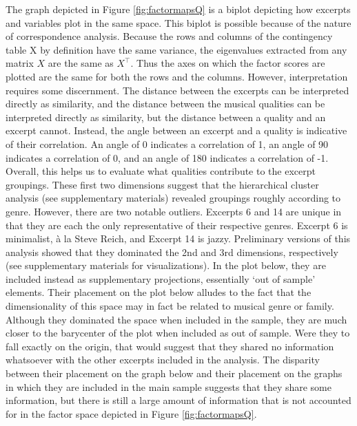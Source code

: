 \documentclass[
  english,
  man,floatsintext]{apa6}
\begin{document}
The graph depicted in Figure \ref{fig:factormapsQ} is a biplot depicting how excerpts and variables plot in the same space. This biplot is possible because of the nature of correspondence analysis. Because the rows and columns of the contingency table X by definition have the same variance, the eigenvalues extracted from any matrix \(\textit{X}\) are the same as \(\textit{X}^\top\). Thus the axes on which the factor scores are plotted are the same for both the rows and the columns. However, interpretation requires some discernment. The distance between the excerpts can be interpreted directly as similarity, and the distance between the musical qualities can be interpreted directly as similarity, but the distance between a quality and an excerpt cannot. Instead, the angle between an excerpt and a quality is indicative of their correlation. An angle of 0 indicates a correlation of 1, an angle of 90 indicates a correlation of 0, and an angle of 180 indicates a correlation of -1.\\
Overall, this helps us to evaluate what qualities contribute to the excerpt groupings. These first two dimensions suggest that the hierarchical cluster analysis (see supplementary materials) revealed groupings roughly according to genre. However, there are two notable outliers. Excerpts 6 and 14 are unique in that they are each the only representative of their respective genres. Excerpt 6 is minimalist, à la Steve Reich, and Excerpt 14 is jazzy. Preliminary versions of this analysis showed that they dominated the 2nd and 3rd dimensions, respectively (see supplementary materials for visualizations). In the plot below, they are included instead as supplementary projections, essentially `out of sample' elements. Their placement on the plot below alludes to the fact that the dimensionality of this space may in fact be related to musical genre or family. Although they dominated the space when included in the sample, they are much closer to the barycenter of the plot when included as out of sample. Were they to fall exactly on the origin, that would suggest that they shared no information whatsoever with the other excerpts included in the analysis. The disparity between their placement on the graph below and their placement on the graphs in which they are included in the main sample suggests that they share some information, but there is still a large amount of information that is not accounted for in the factor space depicted in Figure \ref{fig:factormapsQ}.\\
\end{document}
